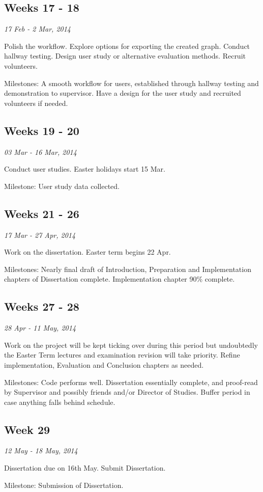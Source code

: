 \subsection*{Weeks 17 - 18}
\emph{17 Feb - 2 Mar, 2014}

Polish the workflow. Explore options for exporting the created graph. Conduct hallway testing. Design user study or alternative evaluation methods. Recruit volunteers.

Milestones: A smooth workflow for users, established through hallway testing and demonstration to supervisor. Have a design for the user study and recruited volunteers if needed.

\subsection*{Weeks 19 - 20}
\emph{03 Mar - 16 Mar, 2014}

Conduct user studies. Easter holidays start 15 Mar.

Milestone: User study data collected. 


\subsection*{Weeks 21 - 26}
\emph{17 Mar - 27 Apr, 2014}

Work on the dissertation. Easter term begins 22 Apr.

Milestones: Nearly final draft of Introduction, Preparation and Implementation chapters of Dissertation complete. Implementation chapter 90\% complete. 


\subsection*{Weeks 27 - 28}
\emph{28 Apr - 11 May, 2014}

Work on the project will be kept ticking over during this period but undoubtedly the Easter Term lectures and examination revision will take priority. 
Refine implementation, Evaluation and Conclusion chapters as needed. 

Milestones:  Code performs well. Dissertation essentially complete, and proof-read by Supervisor and possibly friends and/or Director of Studies. Buffer period in case anything falls behind schedule.


\subsection*{Week 29}
\emph{12 May - 18 May, 2014}

Dissertation due on 16th May. Submit Dissertation. 

Milestone: Submission of Dissertation. 
